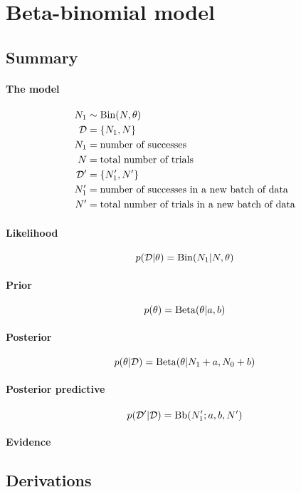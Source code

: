 \section{Beta-binomial model}
\subsection{Summary}
\paragraph{The model}
    \begin{align}
        N_1         &\sim \operatorname{Bin}(N, \theta) \\
        \mathcal D  &= \{N_1, N\} \\
        N_1         &= \text{number of successes} \\
        N           &= \text{total number of trials} \\
        \mathcal D' &= \{N_1', N'\} \\
        N_1'        &= \text{number of successes in a new batch of data} \\
        N'          &= \text{total number of trials in a new batch of data}
    \end{align}

\paragraph{Likelihood}
    \begin{equation}
        p(\mathcal D | \theta) = \operatorname{Bin}(N_1 | N, \theta)
    \end{equation}

\paragraph{Prior}
    \begin{equation}
        p(\theta)   = \operatorname{Beta}(\theta | a, b)
    \end{equation}

\paragraph{Posterior}
    \begin{equation}
        p(\theta | \mathcal D) = \operatorname{Beta}(\theta | N_1 + a, N_0 + b)
    \end{equation}

\paragraph{Posterior predictive}
    \begin{equation}
        p(\mathcal D' | \mathcal D) = \operatorname{Bb}(N_1'; a, b, N')
    \end{equation}

\paragraph{Evidence}

\subsection{Derivations}